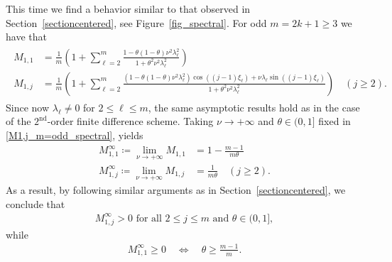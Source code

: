 \documentclass[a4paper]{article}
\newcommand{\te}{\theta}
\begin{document}
\begin{description}[style=unboxed,leftmargin=0cm]
\item [{Case 2:} $m$ is {odd}.]
This time we find a behavior similar to that observed in Section~\ref{sectioncentered}, see
Figure~\ref{fig_spectral}.
For odd $m = 2k+1 \ge 3$ we have that
\begin{align}\label{M1,j_m=odd_spectral}
	\begin{split}
		M_{1,1} & = \frac{1}{m} \left(1 + \sum_{\ell=2}^{m} \frac{1-\theta(1-\theta)\nu^2\lambda^2_\ell}
			{1+\theta^2\nu^2\lambda^2_\ell}\right) \\
		M_{1,j} & = \frac{1}{m} \left(1 + \sum_{\ell=2}^{m} \frac{(1-\theta(1-\theta)\nu^2\lambda^2_\ell)
			\cos((j-1)\xi_\ell) + \nu \lambda_\ell\sin((j-1)\xi_\ell)}{1+\theta^2\nu^2\lambda^2_\ell}
			\right) \quad (j\ge 2).
	\end{split}
\end{align}
Since now $\lambda_\ell\ne 0$ for $2\le\ell\le m$,  the same asymptotic results hold as in the case of the
$2^\text{nd}$-order finite difference scheme.
Taking $\nu \to +\infty$ and $\te \in (0,1]$ fixed in \eqref{M1,j_m=odd_spectral}, yields
\begin{align*}
    M_{1,1}^\infty \coloneqq \lim_{\nu \to +\infty} M_{1,1} & =  1-\frac{m-1}{m\theta} \\
    M_{1,j}^\infty \coloneqq \lim_{\nu \to +\infty} M_{1,j} & = \frac{1}{m\theta} \quad (j \ge 2).
\end{align*}
As a result, by following similar arguments as in Section~\ref{sectioncentered}, we conclude that
\begin{align*}
	M_{1,j}^\infty > 0 \text{ for all } 2\le j\le m \text{ and } \te \in (0,1],
\end{align*}
while
\begin{align*}
	M_{1,1}^\infty \ge 0 \quad\Longleftrightarrow \quad \theta \ge \frac{m-1}{m}.
\end{align*}
\end{description}
\end{document}

